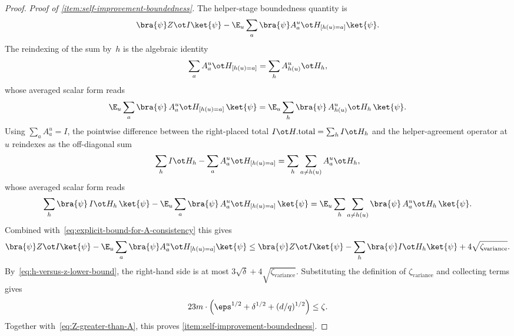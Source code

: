\begin{proof}
  \emph{Proof of \ref{item:self-improvement-boundedness}.}
  The helper-stage boundedness quantity is
  \[
    \bra{\psi} Z \ot I \ket{\psi} -\E_{u} \sum_a \bra{\psi}  A^{u}_{a} \ot H_{[h(u)=a]} \ket{\psi}.
  \]
  The reindexing of the sum by~$h$ is the algebraic identity
  \[
    \sum_a A^u_a \ot H_{[h(u)=a]} = \sum_h A^u_{h(u)} \ot H_h,
  \]
  whose averaged scalar form reads
  \[
    \E_u \sum_a \bra{\psi}\,A^u_a \ot H_{[h(u)=a]}\,\ket{\psi}
      = \E_u \sum_h \bra{\psi}\,A^u_{h(u)} \ot H_h\,\ket{\psi}.
  \]
  Using $\sum_a A_a^u=I$, the pointwise difference between the right-placed
  total $I \ot H.\mathrm{total} = \sum_h I \ot H_h$ and the helper-agreement
  operator at $u$ reindexes as the off-diagonal sum
  \[
    \sum_h I \ot H_h - \sum_a A^u_a \ot H_{[h(u)=a]}
      = \sum_h \sum_{a \neq h(u)} A^u_a \ot H_h,
  \]
  whose averaged scalar form reads
  \[
    \sum_h \bra{\psi}\,I \ot H_h\,\ket{\psi}
        - \E_u \sum_a \bra{\psi}\,A^u_a \ot H_{[h(u)=a]}\,\ket{\psi}
      = \E_u \sum_h \sum_{a \neq h(u)} \bra{\psi}\,A^u_a \ot H_h\,\ket{\psi}.
  \]
  Combined with~\eqref{eq:explicit-bound-for-A-consistency} this gives
  \[
    \bra{\psi} Z \ot I \ket{\psi}
    -\E_{u} \sum_a \bra{\psi}  A^{u}_{a} \ot H_{[h(u)=a]} \ket{\psi}
    \le \bra{\psi} Z \ot I \ket{\psi} - \sum_h \bra{\psi} I \ot H_h \ket{\psi} + 4 \sqrt{\zeta_{\mathrm{variance}}}.
  \]
  By~\eqref{eq:h-versus-z-lower-bound}, the right-hand side is at most $3\sqrt{\delta}+4\sqrt{\zeta_{\mathrm{variance}}}$. Substituting the definition of $\zeta_{\mathrm{variance}}$ and collecting terms gives
  \[
    23m\cdot\Big(\eps^{1/2} + \delta^{1/2} + (d/q)^{1/2}\Big)
    \le \zeta.
  \]
  Together with~\eqref{eq:Z-greater-than-A}, this proves \ref{item:self-improvement-boundedness}.
\end{proof}

